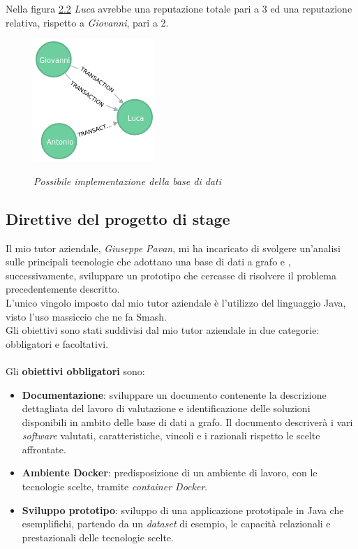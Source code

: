 Nella figura \hyperref[fig:figura 2.2]{2.2} \textit{Luca} avrebbe una reputazione totale pari a 3 ed una reputazione relativa, rispetto a \textit{Giovanni}, pari a 2.
\begin{figure}[h!]
	\centering
	\includegraphics[scale=0.8]{immagini/grafo1.png}
	\label{fig:figura 2.2}
	\caption{\textit{Possibile implementazione della base di dati}}
\end{figure}
\subsection{Direttive del progetto di stage}
Il mio tutor aziendale, \textit{Giuseppe Pavan}, mi ha incaricato di svolgere un'analisi sulle principali tecnologie che adottano una base di dati a grafo e , successivamente, sviluppare un prototipo che cercasse di risolvere il problema precedentemente descritto.\\
L'unico vingolo imposto dal mio tutor aziendale è l'utilizzo del linguaggio Java, visto l'uso massiccio che ne fa Smash\textregistered.\\
Gli obiettivi sono stati suddivisi dal mio tutor aziendale in due categorie: obbligatori e facoltativi.\\
\\
Gli \textbf{obiettivi obbligatori} sono:
\begin{itemize}
\item{\textbf{Documentazione}:} sviluppare un documento contenente la descrizione dettagliata del lavoro di valutazione e identificazione delle soluzioni disponibili in ambito delle base di dati a grafo. Il documento descriverà i vari \textit{software} valutati, caratteristiche, vincoli e i razionali rispetto le scelte affrontate.
\item{\textbf{Ambiente Docker\glsfirstoccur}:} predisposizione di un ambiente di lavoro, con le tecnologie scelte, tramite \textit{container Docker}.
\item{\textbf{Sviluppo prototipo}:} sviluppo di una applicazione prototipale in Java che esemplifichi, partendo da un \textit{dataset} di esempio, le capacità relazionali e prestazionali delle tecnologie scelte.
\end{itemize}

